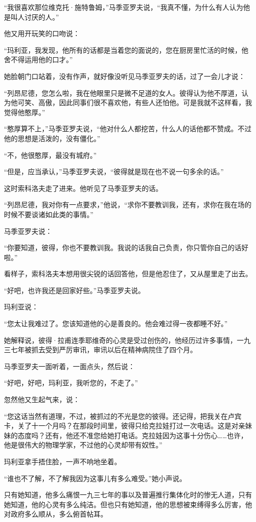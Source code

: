 “我很喜欢那位维克托·施特鲁姆，”马季亚罗夫说，“我真不懂，为什么有人认为他是叫人讨厌的人。”

他又用开玩笑的口吻说：

“玛利亚，我发现，他所有的话都是当着您的面说的，您在厨房里忙活的时候，他舍不得运用他的口才。”

她脸朝门口站着，没有作声，就好像没听见马季亚罗夫的话，过了一会儿才说：

“列昂尼德，您怎么啦，我在他眼里只是微不足道的女人。彼得认为他不厚道，认为他可笑、高傲，因此同事们很不喜欢他，有些人还怕他。可是我就不这样看，我觉得他憨厚。”

“憨厚算不上，”马季亚罗夫说，“他对什么人都挖苦，什么人的话他都不赞成。不过他的思想是活泼的，没有僵化。”

“不，他很憨厚，最没有城府。”

“但是，应当承认，”马季亚罗夫说，“彼得就是现在也不说一句多余的话。”

这时索科洛夫走了进来。他听见了马季亚罗夫的话。

“列昂尼德，我对你有一点要求，”他说，“求你不要教训我，还有，求你在我在场的时候不要谈诸如此类的事情。”

马季亚罗夫说：

“你要知道，彼得，你也不要教训我。我说的话我自己负责，你只管你自己的话好啦。”

看样子，索科洛夫本想用很尖锐的话回答他，但是他忍住了，又从屋里走了出去。

“好吧，也许我还是回家好些。”马季亚罗夫说。

玛利亚说：

“您太让我难过了。您该知道他的心是善良的。他会难过得一夜都睡不好。”

她解释说，彼得·拉甫连季耶维奇的心灵是受过创伤的，他经历过许多事情，一九三七年被抓去受到严厉审讯，审讯以后在精神病院住了四个月。

马季亚罗夫一面听着，一面点头，然后说：

“好吧，好吧，玛利亚，我听您的，不走了。”

忽然他又生起气来，说：

“您这话当然有道理，不过，被抓过的不光是您的彼得。还记得，把我关在卢宾卡，关了十一个月吗？在那段时间里，彼得只给克拉娃打过一次电话。这是对亲妹妹的态度吗？还有，他还不准您给她打电话。克拉娃因为这事十分伤心……也许，他是很伟大的物理学家，不过他的心灵却带有奴性。”

玛利亚拿手捂住脸，一声不响地坐着。

“谁也不了解，不了解我因为这事儿有多么难受。”她小声说。

只有她知道，他多么痛恨一九三七年的事以及普遍推行集体化时的惨无人道，只有她知道，他的心灵有多么纯洁。但也只有她知道，他的思想被束缚得多么厉害，他对政府多么顺从，多么俯首帖耳。

